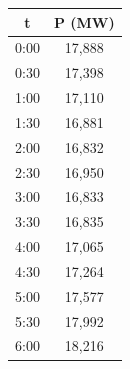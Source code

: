 \documentclass[preview]{standalone}
\begin{document}
\begin{center}
\begin{tabular}{|c|c|}
\hline
   t  & P (MW)  \\
\hline
  0:00 & 17,888\\
\hline
    0:30 & 17,398\\
\hline
1:00 & 17,110\\
\hline
1:30 & 16,881\\
\hline
 2:00&16,832\\\hline
 2:30&16,950\\\hline
 3:00&16,833\\\hline
 3:30&16,835\\\hline
 4:00&17,065\\\hline
 4:30&17,264\\\hline
 5:00&17,577\\\hline
 5:30&17,992\\\hline
 6:00&18,216\\\hline

    
\end{tabular}
\end{center}
\end{document}
